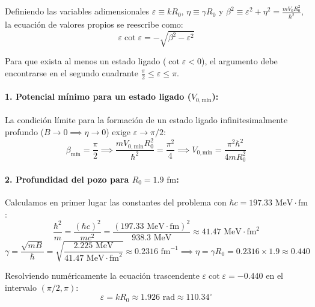 \begin{problema}
Definiendo las variables adimensionales $\varepsilon \equiv k R_0$, $\eta \equiv \gamma R_0$ y $\beta^2 \equiv \varepsilon^2 + \eta^2 = \frac{m V_0 R_0^2}{\hbar^2}$, la ecuación de valores propios se reescribe como:
\begin{equation}
\varepsilon \cot \varepsilon = -\sqrt{\beta^2 - \varepsilon^2}
\end{equation}

Para que exista al menos un estado ligado ($\cot \varepsilon < 0$), el argumento debe encontrarse en el segundo cuadrante $\frac{\pi}{2} \le \varepsilon \le \pi$.

\paragraph{1. Potencial mínimo para un estado ligado ($V_{0,\text{mín}}$):}
La condición límite para la formación de un estado ligado infinitesimalmente profundo ($B \to 0 \implies \eta \to 0$) exige $\varepsilon \to \pi / 2$:
\begin{equation}
\beta_{\text{mín}} = \frac{\pi}{2} \implies \frac{m V_{0,\text{mín}} R_0^2}{\hbar^2} = \frac{\pi^2}{4} \implies V_{0,\text{mín}} = \frac{\pi^2 \hbar^2}{4 m R_0^2}
\end{equation}

\paragraph{2. Profundidad del pozo para $R_0 = 1.9\text{ fm}$:}
Calculamos en primer lugar las constantes del problema con $\hbar c = 197.33\text{ MeV}\cdot\text{fm}$:
\begin{equation}
\frac{\hbar^2}{m} = \frac{(\hbar c)^2}{m c^2} = \frac{(197.33\text{ MeV}\cdot\text{fm})^2}{938.3\text{ MeV}} \approx 41.47\text{ MeV}\cdot\text{fm}^2
\end{equation}
\begin{equation}
\gamma = \frac{\sqrt{m B}}{\hbar} = \sqrt{\frac{2.225\text{ MeV}}{41.47\text{ MeV}\cdot\text{fm}^2}} \approx 0.2316\text{ fm}^{-1} \implies \eta = \gamma R_0 = 0.2316 \times 1.9 \approx 0.440
\end{equation}

Resolviendo numéricamente la ecuación trascendente $\varepsilon \cot \varepsilon = -0.440$ en el intervalo $(\pi/2, \pi)$:
\begin{equation}
\varepsilon = k R_0 \approx 1.926\text{ rad} \approx 110.34^\circ
\end{equation}


\end{problema}
